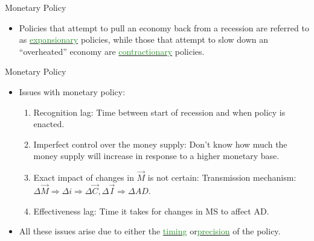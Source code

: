 \documentclass[xcolor={dvipsnames},pdf, hyperref={colorlinks=true, citecolor=ForestGreen, linkcolor=BlueViolet, urlcolor=Magenta}]{beamer}
\theoremstyle{definition}
\newcommand{\dd}[1]{{\underline{\textcolor{ForestGreen}{#1}}}}
\begin{document}
\begin{frame}{Monetary Policy}
\begin{itemize}
\item Policies that attempt to pull an economy back from a recession are referred to as \dd{expansionary} policies, while those that attempt to slow down an ``overheated'' economy are \dd{contractionary} policies.


\end{itemize}
\end{frame}



\begin{frame}{Monetary Policy}
\begin{itemize}

	\item Issues with monetary policy:
	\begin{enumerate}
		\item Recognition lag: Time between start of recession and when policy is enacted.
		\item Imperfect control over the money supply: Don't know how much the money supply will increase in response to a higher monetary base.
		\item Exact impact of changes in $\vec{M}$ is not certain: Transmission mechanism: $\Delta \vec{M} \Rightarrow \Delta i \Rightarrow \Delta \vec{C}, \Delta \vec{I} \Rightarrow \Delta AD$.
		\item Effectiveness lag: Time it takes for changes in MS to affect AD.
	\end{enumerate}
	
	\item All these issues arise due to either the \dd{timing} or\dd{precision} of the policy.
	
\end{itemize}
\end{frame}
\end{document}
